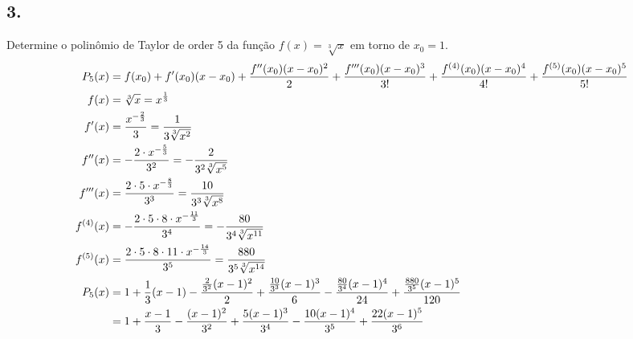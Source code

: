\documentclass{article}
\begin{document}

\subsection{3.}
Determine o polinômio de Taylor de order 5 da função $f(x) = \sqrt[3]{x}$ em
torno de $x_0 = 1$.
\begin{align}
  P_5(x)
  &= f(x_0)
  + f'(x_0)(x - x_0)
  + \frac{f''(x_0)(x - x_0)^2}{2}
  + \frac{f'''(x_0)(x - x_0)^3}{3!}
  + \frac{f^{(4)}(x_0)(x - x_0)^4}{4!}
  + \frac{f^{(5)}(x_0)(x - x_0)^5}{5!} \\
  f(x)
  &= \sqrt[3]{x}
  = x^{\frac{1}{3}}\\
  f'(x)
  &= \frac{x^{-\frac{2}{3}}}{3}
  = \frac{1}{3 \sqrt[3]{x^2}} \\
  f''(x)
  &= -\frac{2 \cdot x^{-\frac{5}{3}}}{3^2}
  = -\frac{2}{3^2 \sqrt[3]{x^5}} \\
  f'''(x)
  &= \frac{2 \cdot 5 \cdot x^{-\frac{8}{3}}}{3^3}
  = \frac{10}{3^3 \sqrt[3]{x^8}} \\
  f^{(4)}(x)
  &= -\frac{2 \cdot 5 \cdot 8 \cdot x^{-\frac{11}{3}}}{3^4}
  = -\frac{80}{3^4 \sqrt[3]{x^{11}}} \\
  f^{(5)}(x)
  &= \frac{2 \cdot 5 \cdot 8 \cdot 11 \cdot x^{-\frac{14}{3}}}{3^5}
  = \frac{880}{3^5 \sqrt[3]{x^{14}}} \\
  P_5(x)
  &= 1
  + \frac{1}{3}(x - 1)
  - \frac{\frac{2}{3^2}(x - 1)^2}{2}
  + \frac{\frac{10}{3^3}(x - 1)^3}{6}
  - \frac{\frac{80}{3^4}(x - 1)^4}{24}
  + \frac{\frac{880}{3^5}(x - 1)^5}{120} \\
  &= 1
  + \frac{x - 1}{3}
  - \frac{(x - 1)^2}{3^2}
  + \frac{5(x - 1)^3}{3^4}
  - \frac{10(x - 1)^4}{3^5}
  + \frac{22(x - 1)^5}{3^6} \notag
\end{align}
\setcounter{equation}{0}
\clearpage

\end{document}
